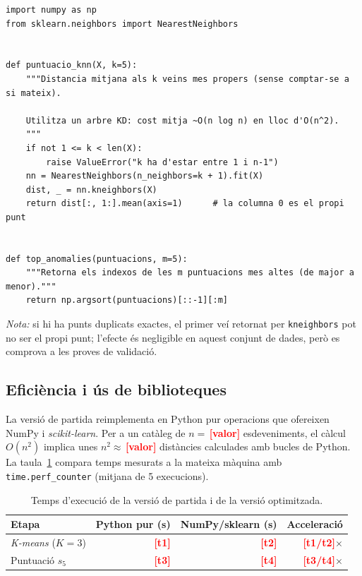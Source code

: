 \documentclass[11pt,a4paper]{article}
\newcommand{\pend}[1]{\textcolor{red}{\textbf{[#1]}}}
\begin{document}
\begin{lstlisting}[caption={Puntuació d'anomalia (\texttt{anomalies.py}).},label={lst:anomalies}]
import numpy as np
from sklearn.neighbors import NearestNeighbors


def puntuacio_knn(X, k=5):
    """Distancia mitjana als k veins mes propers (sense comptar-se a si mateix).

    Utilitza un arbre KD: cost mitja ~O(n log n) en lloc d'O(n^2).
    """
    if not 1 <= k < len(X):
        raise ValueError("k ha d'estar entre 1 i n-1")
    nn = NearestNeighbors(n_neighbors=k + 1).fit(X)
    dist, _ = nn.kneighbors(X)
    return dist[:, 1:].mean(axis=1)      # la columna 0 es el propi punt


def top_anomalies(puntuacions, m=5):
    """Retorna els indexos de les m puntuacions mes altes (de major a menor)."""
    return np.argsort(puntuacions)[::-1][:m]
\end{lstlisting}

\noindent\emph{Nota:} si hi ha punts duplicats exactes, el primer veí retornat
per \texttt{kneighbors} pot no ser el propi punt; l'efecte és negligible en
aquest conjunt de dades, però es comprova a les proves de validació.

\subsection{Eficiència i ús de biblioteques}
La versió de partida reimplementa en Python pur operacions que ofereixen
NumPy i \textit{scikit-learn}. Per a un catàleg de $n=\,$\pend{valor} esdeveniments, el
càlcul $O(n^2)$ implica unes $n^2\approx\,$\pend{valor} distàncies calculades amb
bucles de Python. La taula~\ref{tab:rendiment} compara temps mesurats a la
mateixa màquina amb \texttt{time.perf\_counter} (mitjana de 5 execucions).

\begin{table}[htbp]
\centering
\small
\begin{tabular}{@{}lrrr@{}}
\toprule
\textbf{Etapa} & \textbf{Python pur (s)} & \textbf{NumPy/sklearn (s)} & \textbf{Acceleració} \\
\midrule
\textit{K-means} ($K=3$) & \pend{t1} & \pend{t2} & \pend{t1/t2}$\times$ \\
Puntuació $s_5$ & \pend{t3} & \pend{t4} & \pend{t3/t4}$\times$ \\
\bottomrule
\end{tabular}
\caption{Temps d'execució de la versió de partida i de la versió optimitzada.}
\label{tab:rendiment}
\end{table}
\end{document}
